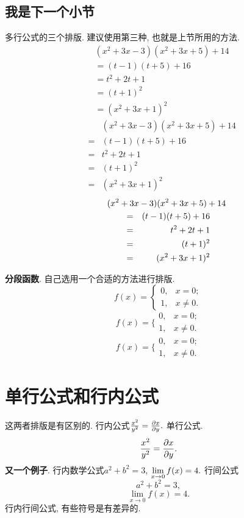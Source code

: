\documentclass[a4paper,12pt,twoside]{ctexart}
\begin{document}
    \subsection{我是下一个小节} 多行公式的三个排版. 建议使用第三种, 也就是上节所用的方法.
        \begin{align*}
        &(x^{2}+3x-3)(x^{2}+3x+5)+14\\
        &=(t-1)(t+5)+16\\
        &=t^{2}+2t+1\\
        &=(t+1)^{2}\\
        &=(x^{2}+3x+1)^{2}
        \end{align*}
        \begin{eqnarray*}
        &&(x^{2}+3x-3)(x^{2}+3x+5)+14\\
        &=&(t-1)(t+5)+16\\
        &=&t^{2}+2t+1\\
        &=&(t+1)^{2}\\
        &=&(x^{2}+3x+1)^{2}
        \end{eqnarray*}
        \begin{eqnarray*}
        \lefteqn{(x^{2}+3x-3)(x^{2}+3x+5)+14}\qquad\\
        &=&(t-1)(t+5)+16\\
        &=&t^{2}+2t+1\\
        &=&(t+1)^{2}\\
        &=&(x^{2}+3x+1)^{2}
        \end{eqnarray*}

    \textbf{分段函数}. 自己选用一个合适的方法进行排版.
        $$f(x)=\begin{cases}
            0,&x=0;\\
            1,&x\ne0.
        \end{cases}$$
        $$
        f(x)=\bigg\{
            \begin{array}{ll}
            0,&x=0;\\
            1,&x\ne0.
            \end{array}
        $$
        $$
        f(x)=\bigg\{\!\!\!
            \begin{array}{ll}
            0,&x=0;\\[-15pt]
            1,&x\ne0.
            \end{array}
        $$

\section{单行公式和行内公式}
    这两者排版是有区别的. 行内公式$\frac{x^2}{y^2}=\frac{\partial x}{\partial y}.$  单行公式.  $$\frac{x^2}{y^2}=\frac{\partial x}{\partial y}.$$
    \textbf{又一个例子}. 行内数学公式$a^2+b^2=3$, $\displaystyle\lim_{x\to0}f(x)=4.$
    行间公式
        $$a^2+b^2=3,$$
        $$\lim_{x\to0}f(x)=4.$$
    行内行间公式, 有些符号是有差异的.
\end{document}
